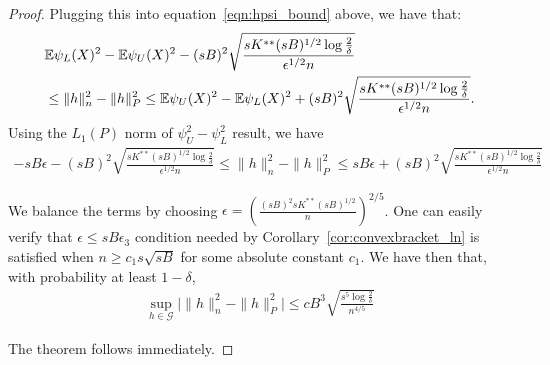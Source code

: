 \begin{proof}
Plugging this into equation~\eqref{eqn:hpsi_bound} above, we have that:
\begin{align*}
& {\mathbb E} \psi_L(X)^2 - {\mathbb E} \psi_U(X)^2 - 
(sB)^2 \sqrt{ \frac{ sK^{**} (sB)^{1/2} \log \frac{2}{\delta}}{ \epsilon^{1/2} n} } \\
 & \leq 
 \| h \|_n^2 - \| h \|_P^2 \leq
{\mathbb E} \psi_U(X)^2 - {\mathbb E} \psi_L(X)^2 + 
(sB)^2 \sqrt{ \frac{ sK^{**} (sB)^{1/2} \log \frac{2}{\delta}}{ \epsilon^{1/2} n} }.
\end{align*}
Using the $L_1(P)$ norm of $\psi_U^2 - \psi_L^2$ result, we have
\begin{align*}
-sB\epsilon - 
(sB)^2 \sqrt{ \frac{ sK^{**} (sB)^{1/2} \log \frac{2}{\delta}}{ \epsilon^{1/2} n} } \leq 
 \| h \|_n^2 - \| h \|_P^2 \leq
sB\epsilon + 
(sB)^2 \sqrt{ \frac{ sK^{**} (sB)^{1/2} \log \frac{2}{\delta}}{ \epsilon^{1/2} n} }
\end{align*}

We balance the terms by choosing $\epsilon = \left( \frac{ (sB)^2 sK^{**} (sB)^{1/2}}{n} \right)^{2/5}$. One can easily verify that $\epsilon \leq sB \epsilon_3$ condition needed by Corollary~\ref{cor:convexbracket_ln} is satisfied when $n \geq c_1 s \sqrt{sB}$ for some absolute constant $c_1$.
We have then that, with probability at least $1-\delta$,
\begin{align*}
\sup_{h \in \mathcal{G}} \big| \| h \|_n^2 - \| h \|_P^2  \big| \leq
  c B^3 \sqrt{ \frac{s^5 \log \frac{2}{\delta}}{n^{4/5}}}
\end{align*}

The theorem follows immediately.





\end{proof}
